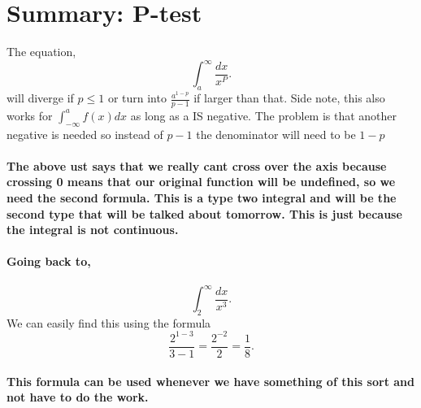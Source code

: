 \documentclass[a4paper]{article}
\begin{document}
\section{Summary: P-test}%
\label{sec:Summary: P-test}

The equation,
\[
\int_{a}^{\infty} \frac{dx}{x^{P}} 
.\] 
will diverge if $p\le 1$ or turn into $\frac{a^{1-p}}{p-1}$ if larger than that. Side note, this also works for $\int_{-\infty}^{a} f(x)dx $ as long as a IS negative. The problem is that another negative is needed so instead of $p-1$ the denominator will need to be $1-p$ 

\paragraph{The above ust says that we really cant cross over the axis because crossing 0 means that our original function will be undefined, so we need the second formula. This is a type two integral and will be the second type that will be talked about tomorrow. This is just because the integral is not continuous.}

\paragraph{Going back to, }

\[
\int_{2}^{\infty} \frac{dx}{x^3} 
.\] 
We can easily find this using the formula
\[
  \frac{2^{1-3}}{3-1}= \frac{2^{-2}}{2}=\frac{1}{8}
.\] 
\paragraph{This formula can be used whenever we have something of this sort and not have to do the work.  }

\newpage
\end{document}

